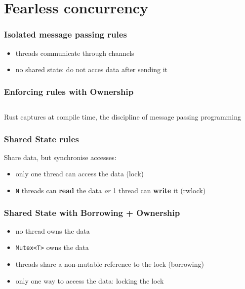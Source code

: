 \documentclass{beamer}
\begin{document}
\section{Fearless concurrency}


\begin{frame}
    \frametitle{Isolated message passing rules}
    \begin{itemize}
        \item threads communicate through channels
        \item no shared state: do not acces data after sending it
    \end{itemize}
\end{frame}

\begin{frame}
    \frametitle{Enforcing rules with Ownership}
    \inputminted[fontsize=\tiny]{rust}{code/isolated_message_passing.rs}
\end{frame}

\begin{frame}
    Rust captures at compile time, the discipline of message passing programming
\end{frame}

\begin{frame}
    \frametitle{Shared State rules}
    Share data, but synchronise accesses:
    \begin{itemize}
        \item only one thread can access the data (lock)
        \item \texttt{N} threads can \textbf{read} the data \textit{or} 1 thread can \textbf{write} it (rwlock)
    \end{itemize}
\end{frame}

\begin{frame}
    \frametitle{Shared State with Borrowing + Ownership}
        \begin{itemize}
            \item no thread owns the data
            \item \texttt{Mutex<T>} owns the data
            \item threads share a non-mutable reference to the lock (borrowing)
            \item only one way to access the data: locking the lock
        \end{itemize}
        \vspace{1.5em}
        \inputminted{rust}{code/lock.rs}
\end{frame}
\end{document}
